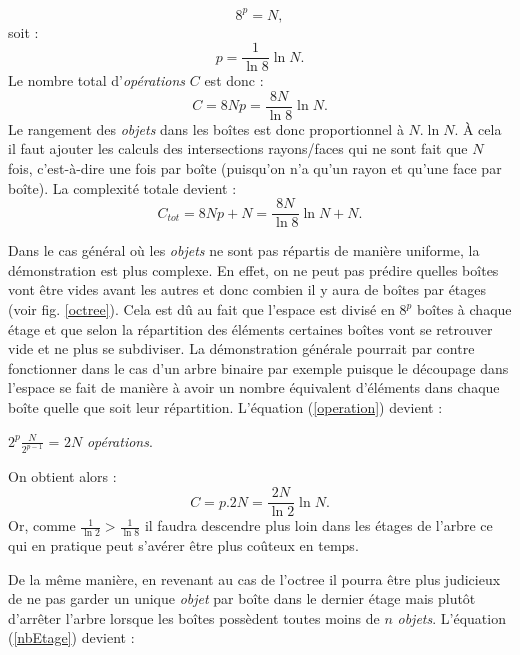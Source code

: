 \begin{equation*}
8^p = N,
\end{equation*}
soit :
\begin{equation}  \label{nbEtage}
p = \frac{1}{\ln{8}}\ln{N}.
\end{equation}
%
Le nombre total d'\textit{opérations} $C$ est donc :
\begin{equation}
C = 8Np = \frac{8N}{\ln8}\ln{N}.
\end{equation}
Le rangement des \textit{objets} dans les boîtes est donc proportionnel à $N.\ln{N}$. À cela il faut ajouter les calculs des intersections rayons/faces qui ne sont fait que $N$ fois, c'est-à-dire une fois par boîte (puisqu'on n'a qu'un rayon et qu'une face par boîte). La complexité totale devient :
\begin{equation}
C_{tot} = 8Np+N = \frac{8N}{\ln8}\ln{N} + N.
\end{equation}

Dans le cas général où les \textit{objets} ne sont pas répartis de manière uniforme, la démonstration est plus complexe. En effet, on ne peut pas prédire quelles boîtes vont être vides avant les autres et donc combien il y aura de boîtes par étages (voir fig. \ref{octree}). Cela est dû au fait que l'espace est divisé en $8^p$ boîtes à chaque étage et que selon la répartition des éléments certaines boîtes vont se retrouver vide et ne plus se subdiviser. La démonstration générale pourrait par contre fonctionner dans le cas d'un arbre binaire par exemple puisque le découpage dans l'espace se fait de manière à avoir un nombre équivalent d'éléments dans chaque boîte quelle que soit leur répartition. L'équation (\ref{operation}) devient :

\begin{center}
$2^p\frac{N}{2^{p-1}}$ = $2N$ \textit{opérations}.
\end{center}
On obtient alors :
\begin{equation}
C = p.2N = \frac{2N}{\ln2}\ln{N}.
\end{equation} 
Or, comme $\frac{1}{\ln2} > \frac{1}{\ln8}$ il faudra descendre plus loin dans les étages de l'arbre ce qui en pratique peut s'avérer être plus coûteux en temps.

De la même manière, en revenant au cas de l'\gls{octree} il pourra être plus judicieux de ne pas garder un unique \textit{objet} par boîte dans le dernier étage mais plutôt d'arrêter l'arbre lorsque les boîtes possèdent toutes moins de $n$ \textit{objets}. L'équation (\ref{nbEtage}) devient :

